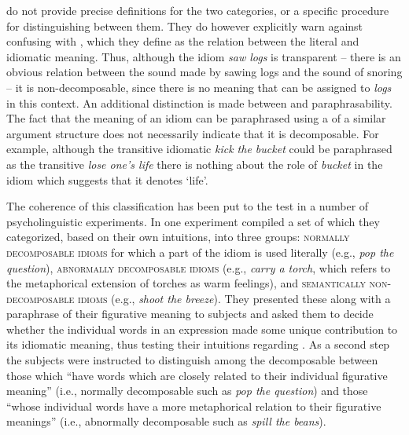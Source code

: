 \documentclass[output=paper]{langsci/langscibook}
\begin{document}
\citet{nunberg94} do not provide precise definitions for the two categories,
or a specific procedure for distinguishing between them. They do however explicitly warn against confusing  with , which they define as the relation between the literal and idiomatic meaning. Thus, although the idiom \textit{saw logs} is transparent -- there is an obvious relation between the sound made by sawing logs and the sound of snoring -- it is non-decomposable, since there is no meaning that can be assigned to \textit{logs} in this context. An additional distinction is made between  and paraphrasability. The fact that the meaning of an idiom can be paraphrased using a  of a similar argument structure does not necessarily indicate that it is decomposable. For example, although the transitive idiomatic  \textit{kick the bucket} could be paraphrased as the transitive  \textit{lose one's life} there is nothing about the role of \textit{bucket} in the idiom which suggests that it denotes `life'.


The coherence of this classification has been put to the
test in a number of psycholinguistic experiments.
In one experiment \citet{gibbs89} compiled a set of  which they categorized, based on their own intuitions, into three groups: {\scshape normally decomposable idioms} for which a part of the idiom is used literally (e.g., \textit{pop the question}),  {\scshape abnormally decomposable idioms}  (e.g., \textit{carry a torch}, which refers to the metaphorical extension of torches as warm feelings), and {\scshape semantically non-de\-com\-pos\-able idioms} (e.g., \textit{shoot the breeze}). They presented these  along with a paraphrase of their figurative meaning to subjects and asked them to decide whether the individual words in an expression made some unique contribution to its idiomatic meaning, thus testing their intuitions regarding . As a second step the subjects were instructed to distinguish among the decomposable  between those which ``have words which are closely related to their individual figurative meaning'' (i.e., normally decomposable  such as \textit{pop the question}) and those ``whose individual words have a more metaphorical relation to their figurative meanings'' (i.e., abnormally decomposable  such as \textit{spill the beans}).
\end{document}
